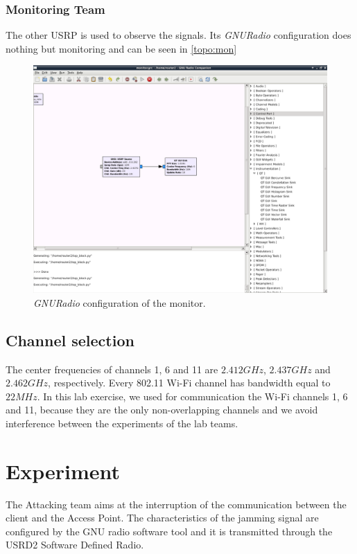 \documentclass[12pt,a4paper]{article}
\begin{document}
	
	\subsubsection{Monitoring Team}
		The other USRP is used to observe the signals. Its \emph{GNURadio} configuration does nothing but monitoring and can be seen in \autoref{topo:mon}
		
		\begin{figure}
			\includegraphics[width=\textwidth]{images/model_mon.png}
			\caption{\emph{GNURadio} configuration of the monitor.}
			\label{topo:mon}
		\end{figure}
	
	\subsection{Channel selection}
		The center frequencies of channels 1, 6 and 11 are $2.412 GHz$, $2.437 GHz$ and $2.462 GHz$, respectively. Every 802.11 Wi-Fi channel has bandwidth equal to $22 MHz$. In this lab exercise, we used for communication the Wi-Fi channels 1, 6 and 11, because they are the only non-overlapping channels and we avoid interference between the experiments of the lab teams.

\section{Experiment}
The Attacking team aims at the interruption of the communication between the client and the Access Point. The characteristics of the jamming signal are configured by the GNU radio software tool and it is transmitted through the USRD2 Software Defined Radio. 
\end{document}
